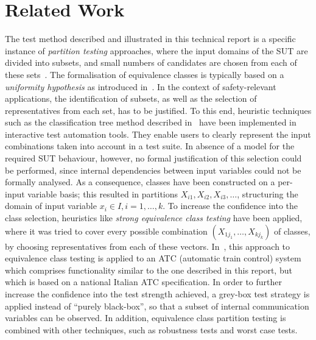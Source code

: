 \section{Related Work}\label{sec:related}

The test method described and illustrated in this technical report is a specific instance of {\it partition testing} approaches, where the input domains of the SUT are divided into subsets, and small numbers of candidates are chosen from each of these sets~\cite{Flammini2}. The formalisation of equivalence classes is typically based on 
a {\it uniformity hypothesis} as introduced in~\cite{gaudel1995}.
In the context of safety-relevant applications, the identification of subsets, as well as the selection of representatives from each set,  has to be justified. To this end, heuristic techniques such as 
  the classification tree method described in~\cite{grochtmann1993classification} have been implemented in interactive test automation tools. They enable users to clearly represent the input combinations taken into account in a test suite.  In absence of a model for the required SUT behaviour, however, no formal justification of this selection could be performed, since internal dependencies between input variables could not be formally analysed. As a consequence, classes have been constructed on a per-input variable basis; this resulted in partitions $X_{i1}, X_{i2}, X_{i3}, \dots$, structuring the domain of input variable $x_i \in I, i = 1,\dots,k$. To increase the confidence into the class selection, heuristics like {\it strong equivalence class testing} have been applied, where it was tried to cover every possible combination 
  $(X_{1j_1},\dots,X_{kj_k})$   of classes, by choosing representatives from each of these vectors. In~\cite{hybridtest}, this approach to equivalence class testing is applied to an   ATC (automatic train control) system which   comprises functionality similar to the one described in this report, but which is based on a national Italian ATC specification. In order to further increase the confidence into the test strength achieved, a  grey-box test strategy is applied instead of ``purely black-box'', so that a subset of internal communication variables can be observed. In addition, equivalence class partition testing is combined with other techniques, such as robustness tests and worst case tests.

